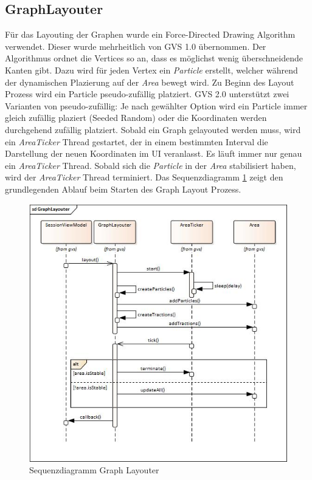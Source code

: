 \documentclass[11pt,a4paper,english,oneside]{book}
\numberwithin{equation}{chapter}
\begin{document}
	\subsection{GraphLayouter} \label{ssec:graphlayouter}
		Für das Layouting der Graphen wurde ein Force-Directed Drawing Algorithm verwendet. Dieser wurde mehrheitlich von GVS 1.0 übernommen. Der Algorithmus ordnet die Vertices so an, dass es möglichst wenig überschneidende Kanten gibt. Dazu wird für jeden Vertex ein \textit{Particle} erstellt, welcher während der dynamischen Plazierung auf der \textit{Area} bewegt wird. Zu Beginn des Layout Prozess wird ein Particle pseudo-zufällig platziert. GVS 2.0 unterstützt zwei Varianten von pseudo-zufällig: Je nach gewählter Option wird ein Particle immer gleich zufällig plaziert (Seeded Random) oder die Koordinaten werden durchgehend zufällig platziert. Sobald ein Graph gelayouted werden muss, wird ein \textit{AreaTicker} Thread gestartet, der in einem bestimmten Interval die Darstellung der neuen Koordinaten im UI veranlasst. Es läuft immer nur genau ein \textit{AreaTicker} Thread. Sobald sich die \textit{Particle} in der \textit{Area} stabilisiert haben, wird der \textit{AreaTicker} Thread terminiert. Das Sequenzdiagramm \ref{fig:sequencegraphlayouter} zeigt den grundlegenden Ablauf beim Starten des Graph Layout Prozess.
	
	\begin{figure}[h!]
		\centering
		\includegraphics[width=0.6\linewidth]{assets/images/sequence_graph_layouter}
		\caption{Sequenzdiagramm Graph Layouter}
		\label{fig:sequencegraphlayouter}
	\end{figure}
	
\end{document}
